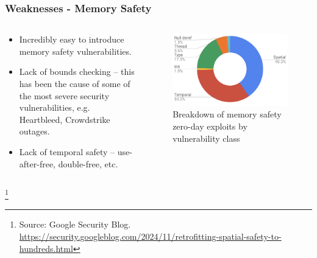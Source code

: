 \documentclass{beamer}
\newcommand\blfootnote[1]{%
  \begingroup
  \renewcommand\thefootnote{}\footnote{#1}%
  \addtocounter{footnote}{-1}%
  \endgroup
}
\begin{document}
\begin{frame}[fragile]
    \frametitle{Weaknesses - Memory Safety}

    \begin{columns}
        \begin{column}{0.5\textwidth}
            
            \begin{itemize}
                \item Incredibly easy to introduce memory safety vulnerabilities.
                \item Lack of bounds checking -- this has been the cause of some of the most severe security vulnerabilities, e.g. Heartbleed, Crowdstrike outages.
                \item Lack of temporal safety -- use-after-free, double-free, etc.
            \end{itemize}

        \end{column}

        \begin{column}{0.5\textwidth}
            \begin{figure}
                \centering
                \includegraphics[width=1.0\textwidth]{google0-day.png}
                \caption*{Breakdown of memory safety zero-day exploits by vulnerability class}
            \end{figure}
        \end{column}
    \end{columns}
    \blfootnote{Source: Google Security Blog. \url{https://security.googleblog.com/2024/11/retrofitting-spatial-safety-to-hundreds.html}}
\end{frame}
\end{document}
